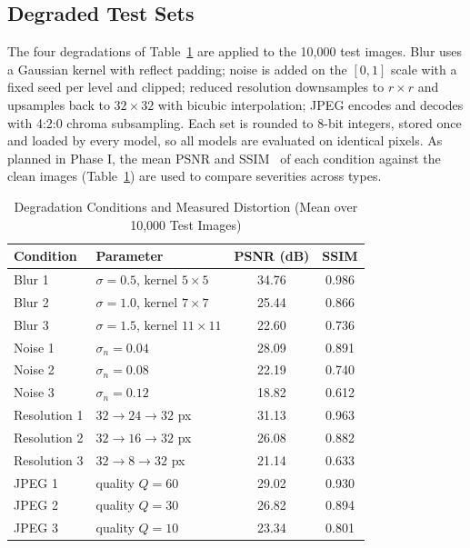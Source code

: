\documentclass[conference]{IEEEtran}
\begin{document}
\subsection{Degraded Test Sets}
The four degradations of Table~\ref{tab:degradations} are applied to the 10{,}000 test images. Blur uses a Gaussian kernel with reflect padding; noise is added on the $[0,1]$ scale with a fixed seed per level and clipped; reduced resolution downsamples to $r\times r$ and upsamples back to $32\times32$ with bicubic interpolation; JPEG encodes and decodes with 4:2:0 chroma subsampling. Each set is rounded to 8-bit integers, stored once and loaded by every model, so all models are evaluated on identical pixels. As planned in Phase I, the mean PSNR and SSIM~\cite{wang2004} of each condition against the clean images (Table~\ref{tab:degradations}) are used to compare severities across types.

\begin{table}[!t]
\caption{Degradation Conditions and Measured Distortion (Mean over 10{,}000 Test Images)}
\label{tab:degradations}
\centering
\footnotesize
\renewcommand{\arraystretch}{1.1}
\setlength{\tabcolsep}{4pt}
\begin{tabular}{@{}llcc@{}}
\toprule
\textbf{Condition} & \textbf{Parameter} & \textbf{PSNR (dB)} & \textbf{SSIM} \\
\midrule
Blur 1 & $\sigma = 0.5$, kernel $5\times5$ & 34.76 & 0.986 \\
Blur 2 & $\sigma = 1.0$, kernel $7\times7$ & 25.44 & 0.866 \\
Blur 3 & $\sigma = 1.5$, kernel $11\times11$ & 22.60 & 0.736 \\
\midrule
Noise 1 & $\sigma_n = 0.04$ & 28.09 & 0.891 \\
Noise 2 & $\sigma_n = 0.08$ & 22.19 & 0.740 \\
Noise 3 & $\sigma_n = 0.12$ & 18.82 & 0.612 \\
\midrule
Resolution 1 & $32\to24\to32$ px & 31.13 & 0.963 \\
Resolution 2 & $32\to16\to32$ px & 26.08 & 0.882 \\
Resolution 3 & $32\to8\to32$ px & 21.14 & 0.633 \\
\midrule
JPEG 1 & quality $Q = 60$ & 29.02 & 0.930 \\
JPEG 2 & quality $Q = 30$ & 26.82 & 0.894 \\
JPEG 3 & quality $Q = 10$ & 23.34 & 0.801 \\
\bottomrule
\end{tabular}
\end{table}
\end{document}
